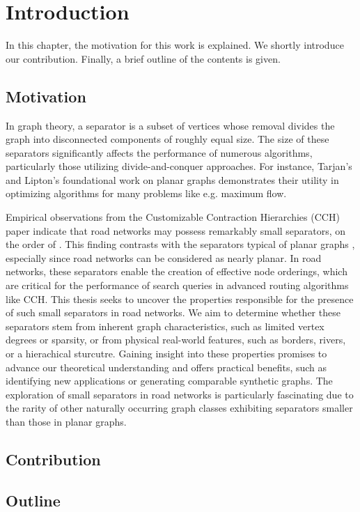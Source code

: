 \chapter{Introduction}
\label{ch:introduction}

In this chapter, the motivation for this work is explained. 
We shortly introduce our contribution.
Finally, a brief outline of the contents is given.

\section{Motivation}
\label{sec:motivation}

In graph theory, a separator is a subset of vertices whose removal divides the graph into disconnected components of roughly equal size.
The size of these separators significantly affects the performance of numerous algorithms, particularly those utilizing divide-and-conquer approaches.
For instance, Tarjan's and Lipton's foundational work on planar graphs \cite{lipton_applications_1977} demonstrates their utility in optimizing algorithms for many problems like e.g. maximum flow.

Empirical observations from the Customizable Contraction Hierarchies (CCH) paper indicate that road networks may possess remarkably small separators, on the order of  \cite{dibbelt_customizable_2016}.
This finding contrasts with the  separators typical of planar graphs \cite{lipton_separator_1979}, especially since road networks can be considered as nearly planar.
In road networks, these separators enable the creation of effective node orderings, which are critical for the performance of search queries in advanced routing algorithms like CCH.
This thesis seeks to uncover the properties responsible for the presence of such small separators in road networks.
We aim to determine whether these separators stem from inherent graph characteristics, such as limited vertex degrees or sparsity, or from physical real-world features, such as borders, rivers, or a hierachical sturcutre.
Gaining insight into these properties promises to advance our theoretical understanding and offers practical benefits, such as identifying new applications or generating comparable synthetic graphs.
The exploration of small separators in road networks is particularly fascinating due to the rarity of other naturally occurring graph classes exhibiting separators smaller than those in planar graphs.

\section{Contribution}
\label{sec:Contribution}


\section{Outline}
\label{sec:overview}

